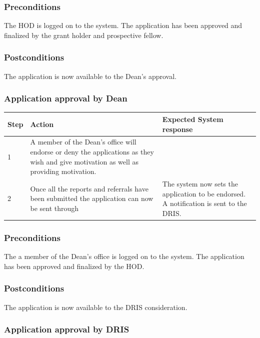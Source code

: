 \documentclass[12pt]{article}
\begin{document}
\subsubsection*{Preconditions}
The HOD is logged on to the system. The application has been approved and finalized by the grant holder and prospective fellow.

\subsubsection*{Postconditions}
The application is now available to the Dean's approval.

\subsubsection{Application approval by Dean}

\begin{center}
\begin{tabular}{|l|p{6cm}|p{8cm}|}
\hline
Step & Action & Expected System response \\
\hline
1 & A member of the Dean's office will endorse or deny the applications as they wish and give motivation as well as providing motivation. \\
\hline
2 & Once all the reports and referrals have been submitted the application can now be sent through  & The system now sets the application to be endorsed. A notification is sent to the DRIS. \\
\hline
\end{tabular}
\end{center}

\subsubsection*{Preconditions}
The a member of the Dean's office is logged on to the system. The application has been approved and finalized by the HOD.

\subsubsection*{Postconditions}
The application is now available to the DRIS consideration.

\subsubsection{Application approval by DRIS}
\end{document}
